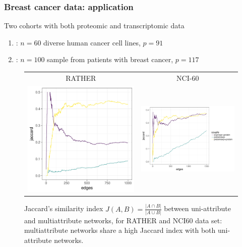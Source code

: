 \begin{frame}
  \frametitle{Breast cancer data: application}

  Two cohorts with both proteomic and transcriptomic data
  \begin{enumerate}
    \item {}: $n=60$ diverse human cancer cell lines, $p=91$
    \item  {}: $n=100$ sample from patients with breast cancer, $p=117$
  \end{enumerate}

\begin{figure}[htbp!]
  \centering
  \begin{tabular}{@{}cc@{}}
   RATHER & NCI-60 \\
    \includegraphics[width=.35\textwidth]{figures/jaccard_RATHER}
  & \includegraphics[width=.5\textwidth]{figures/jaccard_NCI60}
  \end{tabular}
  \caption{Jaccard's similarity index
    $J(A,B) = \frac{\left|A\cap B\right|}{\left|A\cup B\right|}$
    between uni-attribute and multiattribute networks, for RATHER and
    NCI60 data set: multiattribute networks share a high Jaccard
    index with both uni-attribute networks.}
  \label{fig:jaccard}
\end{figure}

\end{frame}

